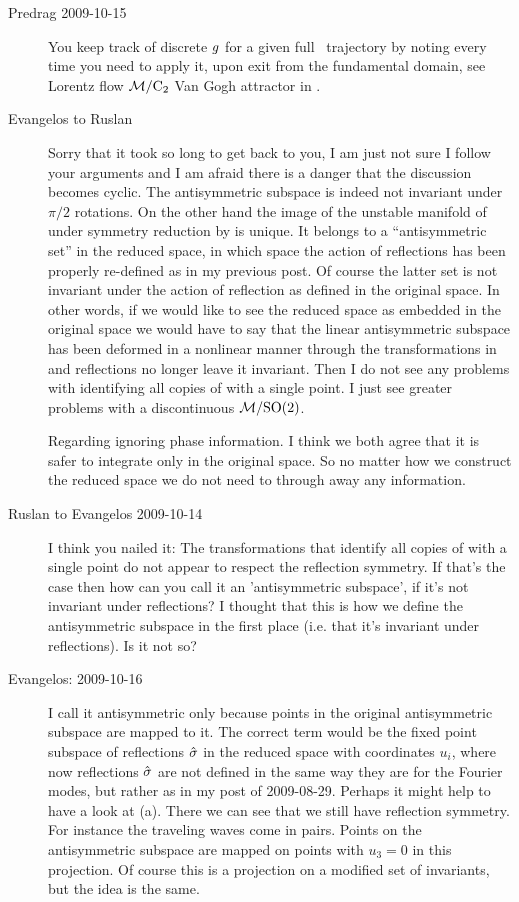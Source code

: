 \begin{description}
\item[Predrag 2009-10-15]
You keep track of discrete $g$ for a given full
\statesp\ trajectory by noting every time you need to apply
it, upon exit from the fundamental domain, see Lorentz flow
${\cal M}/\textrm{C}_2$ Van Gogh attractor in
.


\item[Evangelos to Ruslan]
Sorry that it took so long to get back to you, I am
just not sure I follow your arguments and I am afraid there
is a danger that the discussion becomes cyclic. The
antisymmetric subspace is indeed not invariant under $\pi/2$
rotations. On the other hand the image of the unstable
manifold of  under symmetry reduction by
 is unique. It belongs to a
``antisymmetric set'' in the reduced space, in which space the
action of reflections has been properly re-defined as in my
previous post. Of course the latter set is not invariant
under the action of reflection as defined in the original
space. In other words, if we would like to see the reduced
space as embedded in the original space we would have to say
that the linear antisymmetric subspace has been deformed in a
nonlinear manner through the transformations in
 and reflections no longer leave it
invariant. Then I do not see any problems with identifying
all copies of  with a single point. I just see greater
problems with a discontinuous ${\cal M}/\textrm{SO}(2)$.

Regarding ignoring phase information. I think we both agree
that it is safer to integrate only in the original space. So
no matter how we construct the reduced space we do not need
to through away any information.


\item[Ruslan to Evangelos 2009-10-14]
I think you nailed it: The transformations that identify all
copies of  with a single point do not appear to
respect the reflection symmetry.  If that's the case then how
can you call it an 'antisymmetric subspace', if it's not
invariant under reflections?  I thought that this is how we
define the antisymmetric subspace in the first place (i.e.
that it's invariant under reflections).  Is it not so?


\item[Evangelos: 2009-10-16]
I call it antisymmetric only because points in the original
antisymmetric subspace are mapped to it. The correct term
would be the fixed point subspace of reflections
$\hat{\sigma}$ in the reduced space with coordinates $u_i$,
where now reflections $\hat{\sigma}$ are not defined in the
same way they are for the Fourier modes, but rather as in my
post of 2009-08-29. Perhaps it might help to have a look at
(a). There we can see that we still have
reflection symmetry. For instance the traveling waves come in
pairs. Points on the antisymmetric subspace are mapped on
points with $u_3=0$ in this projection. Of course this is a
projection on a modified set of invariants, but the idea is
the same.



\end{description}
